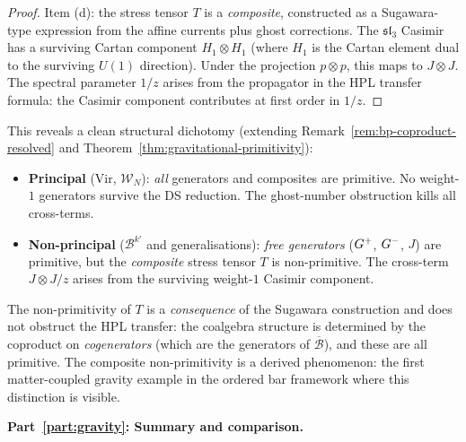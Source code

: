 \begin{computation}[The ordered bar complex of the
Bershadsky--Polyakov algebra
$\mathcal{B}^{k'} = W_{k'}(\mathfrak{sl}_3,f_{\min})$;
\ClaimStatusProvedHere]
\begin{proof}
Item (d): the stress tensor $T$ is a \emph{composite},
constructed as a Sugawara-type expression from the affine
currents plus ghost corrections. The $\mathfrak{sl}_3$
Casimir has a surviving Cartan component
$H_1\otimes H_1$ (where $H_1$ is the Cartan element
dual to the surviving $U(1)$ direction). Under the
projection $p\otimes p$, this maps to $J\otimes J$.
The spectral parameter $1/z$ arises from the propagator
in the HPL transfer formula: the Casimir component
contributes at first order in $1/z$.
\end{proof}

\begin{remark}
\label{rem:bp-coproduct-dichotomy}
This reveals a clean structural dichotomy
(extending Remark~\ref{rem:bp-coproduct-resolved}
and Theorem~\ref{thm:gravitational-primitivity}):
\begin{itemize}
\item \textbf{Principal} ($\mathrm{Vir}$,
$\mathcal{W}_N$):
\emph{all} generators and composites are primitive.
No weight-$1$ generators survive the DS reduction.
The ghost-number obstruction kills all cross-terms.
\item \textbf{Non-principal} ($\mathcal{B}^{k'}$
and generalisations):
\emph{free generators} ($G^+$, $G^-$, $J$) are
primitive, but the \emph{composite} stress tensor $T$
is non-primitive. The cross-term $J\otimes J/z$
arises from the surviving weight-$1$ Casimir component.
\end{itemize}
The non-primitivity of $T$ is a \emph{consequence} of
the Sugawara construction and does not obstruct the HPL
transfer: the coalgebra structure is determined by the
coproduct on \emph{cogenerators} (which are the generators
of $\overline{\mathcal{B}}$), and these are all primitive.
The composite non-primitivity is a derived phenomenon:
the first matter-coupled gravity example in the ordered
bar framework where this distinction is visible.
\end{remark}

\medskip
\noindent\textbf{Part~\ref{part:gravity}: Summary and comparison.}


\end{computation}
